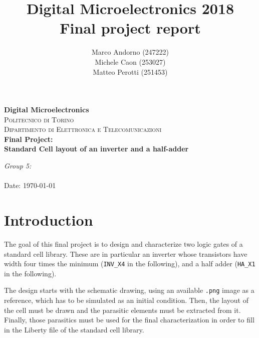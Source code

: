 \documentclass[a4paper]{article}
\title{Digital Microelectronics 2018 \\ Final project report}
\author{Marco Andorno (247222)\\ Michele Caon (253027) \\ Matteo Perotti (251453)}
\newcommand{\inv}{\texttt{INV\_X4}\xspace}
\newcommand{\ha}{\texttt{HA\_X1}\xspace}
\begin{document}
\begin{center}

\thispagestyle{empty}

\textbf{\Large Digital Microelectronics}\\[1.0cm]
\textsc{\Large Politecnico di Torino}\\[0.5cm]
\textsc{\large Dipartimento di Elettronica e Telecomunicazioni}\\[1cm]

\huge \textbf{Final Project: \\ Standard Cell layout of an inverter and a half-adder}

\end{center}

\vfill
\large
\begin{flushleft}
\makeatletter
\emph{Group 5:}\\
\@author \\
\vspace{1cm}
\normalsize Date: \today
\makeatother
\end{flushleft}


\newpage

\pagestyle{fancy}
\lhead{}
\chead{}
\rhead{\leftmark}
\lfoot{\thepage}
\cfoot{}
\rfoot{}
\renewcommand{\headrulewidth}{0.3pt}
\renewcommand{\footrulewidth}{0.3pt}


\section{Introduction}
The goal of this final project is to design and characterize two logic gates of a standard cell library. These are in particular an inverter whose transistors have width four times the minimum (\inv in the following), and a half adder (\ha in the following).

The design starts with the schematic drawing, using an available \texttt{.png} image as a reference, which has to be simulated as an initial condition. Then, the layout of the cell must be drawn and the parasitic elements must be extracted from it. Finally, those parasitics must be used for the final characterization in order to fill in the Liberty file of the standard cell library.
\end{document}
